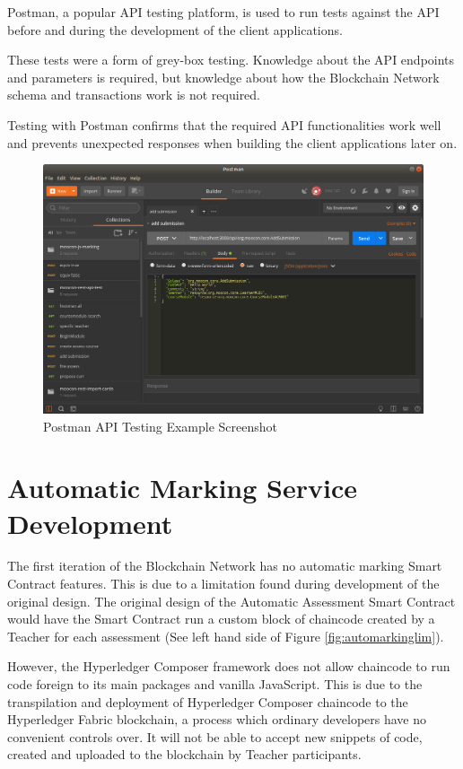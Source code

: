 Postman, a popular API testing platform, is used to run tests against the API 
before and during the development of the client applications. 

These tests were a form of grey-box testing. Knowledge about the API endpoints 
and parameters is required, but knowledge about how the Blockchain Network schema
and transactions work is not required. 

Testing with Postman confirms that the required API functionalities work well and 
prevents unexpected responses when building the client applications later on.

\clearpage
\begin{figure}[!ht]
	\centering
	\includegraphics[width=1.0\textwidth]{postman}
	\caption[Postman API Testing Example Screenshot]
	{Postman API Testing Example Screenshot}
	\label{fig:postman}
\end{figure}

\section{Automatic Marking Service Development}

The first iteration of the Blockchain Network has no automatic marking Smart Contract features.
This is due to a limitation found during development of the original design. The original design
of the Automatic Assessment Smart Contract would have the Smart Contract run a custom block of chaincode
created by a Teacher for each assessment (See left hand side of Figure \ref{fig:automarkinglim}).

However, the Hyperledger Composer framework does not allow chaincode to run code foreign to its main packages and vanilla JavaScript.
This is due to the transpilation and deployment of Hyperledger Composer chaincode to the Hyperledger Fabric blockchain,
a process which ordinary developers have no convenient controls over. It will not be able to accept new snippets of code,
created and uploaded to the blockchain by Teacher participants.

